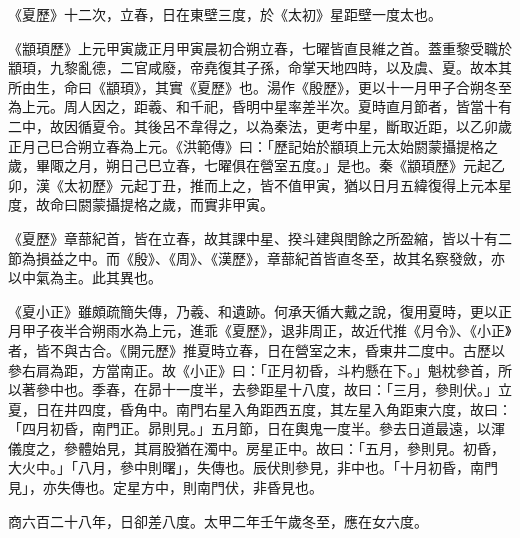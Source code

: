 \begin{pinyinscope}
 《夏歷》十二次，立春，日在東壁三度，於《太初》星距壁一度太也。



 《顓頊歷》上元甲寅歲正月甲寅晨初合朔立春，七曜皆直艮維之首。蓋重黎受職於顓頊，九黎亂德，二官咸廢，帝堯復其子孫，命掌天地四時，以及虞、夏。故本其所由生，命曰《顓頊》，其實《夏歷》也。湯作《殷歷》，更以十一月甲子合朔冬至為上元。周人因之，距羲、和千祀，昏明中星率差半次。夏時直月節者，皆當十有二中，故因循夏令。其後呂不韋得之，以為秦法，更考中星，斷取近距，以乙卯歲正月己巳合朔立春為上元。《洪範傳》曰：「歷記始於顓頊上元太始閼蒙攝提格之歲，畢陬之月，朔日己巳立春，七曜俱在營室五度。」是也。秦《顓頊歷》元起乙卯，漢《太初歷》元起丁丑，推而上之，皆不值甲寅，猶以日月五緯復得上元本星度，故命曰閼蒙攝提格之歲，而實非甲寅。



 《夏歷》章蔀紀首，皆在立春，故其課中星、揆斗建與閏餘之所盈縮，皆以十有二節為損益之中。而《殷》、《周》、《漢歷》，章蔀紀首皆直冬至，故其名察發斂，亦以中氣為主。此其異也。



 《夏小正》雖頗疏簡失傳，乃羲、和遺跡。何承天循大戴之說，復用夏時，更以正月甲子夜半合朔雨水為上元，進乖《夏歷》，退非周正，故近代推《月令》、《小正》者，皆不與古合。《開元歷》推夏時立春，日在營室之末，昏東井二度中。古歷以參右肩為距，方當南正。故《小正》曰：「正月初昏，斗杓懸在下。」魁枕參首，所以著參中也。季春，在昴十一度半，去參距星十八度，故曰：「三月，參則伏。」立夏，日在井四度，昏角中。南門右星入角距西五度，其左星入角距東六度，故曰：「四月初昏，南門正。昴則見。」五月節，日在輿鬼一度半。參去日道最遠，以渾儀度之，參體始見，其肩股猶在濁中。房星正中。故曰：「五月，參則見。初昏，大火中。」「八月，參中則曙」，失傳也。辰伏則參見，非中也。「十月初昏，南門見」，亦失傳也。定星方中，則南門伏，非昏見也。



 商六百二十八年，日卻差八度。太甲二年壬午歲冬至，應在女六度。




\end{pinyinscope}
